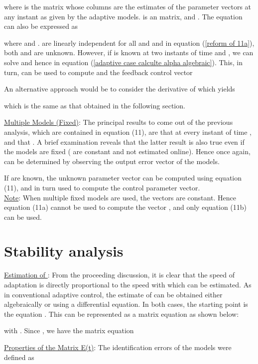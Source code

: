 \documentclass[conference]{IEEEtran}
\begin{document}
where  is the matrix whose columns are the estimates of the parameter vectors at any instant  as given by the  adaptive models.  is an  matrix,  and . The equation can also be expressed as

where  and .  are linearly independent for all  and  and in equation (\ref{reform of 11a}), both  and  are unknown. However, if  is known at two instants of time  and , we can solve  and hence  in equation (\ref{adaptive case calculte alpha algebraic}). This, in turn, can be used to compute  and the feedback control vector

An alternative approach would be to consider the derivative of  which yields

which is the same as that obtained in the following section.



{\large \underline{Multiple Models (Fixed)}}: The principal results to come out of the previous analysis, which are contained in equation (11), are that  at every instant of time , and that . A brief examination reveals that the latter result is also true even if the models are fixed (  are constant and not estimated online). Hence once again,  can be determined by observing the output error vector  of the  models.

If  are known, the unknown parameter vector  can be computed using equation (11), and in turn used to compute the control parameter vector.\\
{\large \underline{Note}}: When multiple fixed models are used, the vectors  are constant. Hence equation (11a) cannot be used to compute the vector , and only equation (11b) can be used.








\section{Stability analysis}
{\large \underline{Estimation of }}: From the proceeding discussion, it is clear that the speed of adaptation is directly proportional to the speed with which  can be estimated. As in conventional adaptive control, the estimate  of  can be obtained either algebraically or using a differential equation. In both cases, the starting point is the equation . This can be represented as a matrix equation as shown below:

with . Since , we have the matrix equation


{\large \underline{Properties of the Matrix E(t)}}: The identification errors  of the  models  were defined as
\end{document}
